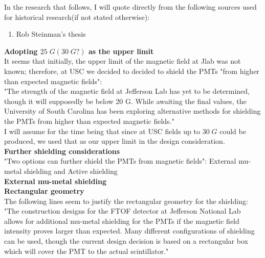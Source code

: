 \documentclass[12pt]{article}
\begin{document}
In the research that follows, I will quote directly from the following sources used for historical research(if not stated otherwise):
\begin{enumerate}
	\item Rob Steinman's thesis
\end{enumerate} 

\textbf{Adopting $25\;G(30\;G?)$ as the upper limit} \\
It seems that initially, the upper limit of the magnetic field at Jlab was not known; therefore, at USC we decided to decided to shield the PMTs "from higher than expected magnetic fields":\\
\newline
"The strength of the magnetic field at Jefferson Lab has yet to be determined, though it will supposedly be below 20 G. While awaiting the final values, the University of South Carolina has been exploring alternative methods for shielding the PMTs from higher than expected magnetic fields."\\
\newline
I will assume for the time being that since at USC fields up to $30\;G$ could be produced, we used that as our upper limit in the design consideration.\\
\newline
\textbf{Further shielding considerations} \\
"Two options can further shield the PMTs from magnetic fields": External mu-metal shielding and Active shielding \\
\newline
\textbf{External mu-metal shielding} \\
\newline
\textbf{Rectangular geometry} \\
The following lines seem to justify the rectangular geometry for the shielding:\\
\newline
"The construction designs for the FTOF detector at Jefferson National Lab allows for additional mu-metal shielding for the PMTs if the magnetic field intensity proves larger than expected. Many different configurations of shielding can be used, though the current design decision is based on a rectangular box which will cover the PMT to the actual scintillator."\\
\end{document}
